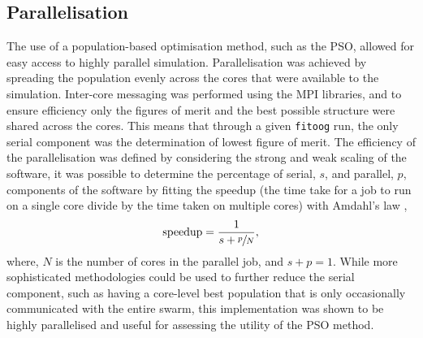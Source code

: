 \subsection{Parallelisation}
\label{sec:para}
The use of a population-based optimisation method, such as the PSO, allowed for easy access to highly parallel simulation.
Parallelisation was achieved by spreading the population evenly across the cores that were available to the simulation.
Inter-core messaging was performed using the MPI libraries, and to ensure efficiency only the figures of merit and the best possible structure were shared across the cores.
This means that through a given \texttt{fitoog} run, the only serial component was the determination of lowest figure of merit.
The efficiency of the parallelisation was defined by considering the strong and weak scaling of the software, it was possible to determine the percentage of serial, $s$, and parallel, $p$, components of the software by fitting the speedup (the time take for a job to run on a single core divide by the time taken on multiple cores) with Amdahl's law \cite{amdahl_validity_1967},
%
\begin{equation}
\text{speedup} = \frac{1}{s + \sfrac{p}{N}},
\end{equation}
%
where, $N$ is the number of cores in the parallel job, and $s + p = 1$.
While more sophisticated methodologies could be used to further reduce the serial component, such as having a core-level best population that is only occasionally communicated with the entire swarm, this implementation was shown to be highly parallelised and useful for assessing the utility of the PSO method.
